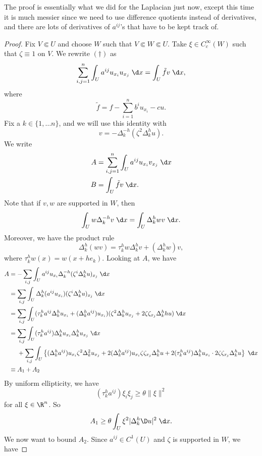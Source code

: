 \documentclass[a4paper]{article}
\begin{document}
The proof is essentially what we did for the Laplacian just now, except this time it is much messier since we need to use difference quotients instead of derivatives, and there are lots of derivatives of $a^{ij}$'s that have to be kept track of.
\begin{proof}
  Fix $V \Subset U$ and choose $W$ such that $V \Subset W \Subset U$. Take $\xi \in C_c^\infty(W)$ such that $\zeta \equiv 1$ on $V$. We rewrite $(\dagger)$ as
  \[
    \sum_{i, j = 1}^n \int_U a^{ij} u_{x_i} u_{x_j} \;\d x = \int_U \tilde{f} v\;\d x,
  \]
  where
  \[
    \tilde{f} = f - \sum_{i = 1}^n b^i u_{x_i} - cu.
  \]
  Fix a $k \in \{1, \ldots n\}$, and we will use this identity with
  \[
    v = - \Delta_k^{-h} (\zeta^2 \Delta_k^h u).
  \]
  We write
  \begin{align*}
    A &= \sum_{i, j = 1}^n \int_U a^{ij} u_{x_i} v_{x_j} \;\d x\\
    B &= \int_U \tilde{f} v\;\d x.
  \end{align*}
  Note that if $v, w$ are supported in $W$, then
  \[
    \int_U w \Delta_k^{-h}v\;\d x = \int_U \Delta^h_k w v\;\d x.
  \]
  Moreover, we have the product rule
  \[
    \Delta^h_k(w v) = \tau_k^h w \Delta_k^h v + (\Delta_k^h w) v,
  \]
  where $\tau_k^h w (x) = w(x + h e_k)$. Looking at $A$, we have
  \begin{align*}
    A &= - \sum_{i, j} \int_U a^{ij} u_{x_i} \Delta_k^{-h} (\zeta^i \Delta_k^h u)_{x_j}\;\d x\\
    &= \sum_{i, j} \int_U \Delta^h_k (a^{ij} u_{x_i}) (\zeta^i \Delta_k^h u)_{x_j}\;\d x\\
    &= \sum_{i, j} \int_U (\tau^h_k a^{ij} \Delta_k^h u_{x_i} + (\Delta_k^h a^{ij}) u_{x_i}) (\zeta^2 \Delta^h_k u_{x_j} + 2 \zeta \zeta_{x_j} \Delta_k^hh u)\;\d x\\
    &= \sum_{i, j} \int_U (\tau_k^h a^{ij}) \Delta_k^h u_{x_i} \Delta_k^h u_{x_j}\;\d x\\
    &\hphantom{{}={}} + \sum_{i, j} \int_U \left\{ (\Delta^h_k a^{ij}) u_{x_i} \zeta^2 \Delta_k^2 u_{x_j} + 2(\Delta_k^h a^{ij}) u_{x_i} \zeta \zeta_{x_j} \Delta_k^h u + 2(\tau_k^h a^{ij}) \Delta^h_k u_{x_i} \cdot 2 \zeta \zeta_{x_j} \Delta_k^h u \right\}\;\d x\\ %
    &\equiv A_1 + A_2
  \end{align*}
  By uniform ellipticity, we have
  \[
    (\tau_k^h a^{ij}) \xi_i \xi_j \geq \theta \|\xi\|^2
  \]
  for all $\xi \in \R^n$. So
  \[
    A_1 \geq \theta \int_U \xi^2 |\Delta^h_k \D u|^2\;\d x.
  \]
  We now want to bound $A_2$. Since $a^{ij} \in C^1(U)$ and $\zeta$ is supported in $W$, we have

\end{proof}
\end{document}
